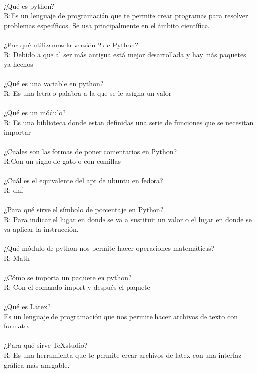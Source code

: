 \documentclass{book}
\begin{document}
	\\
	¿Qué es python?\\
	R:Es un lenguaje de programación que te permite crear programas para resolver problemas específicos. Se usa principalmente en el ámbito científico. \\
	\\
	¿Por qué utilizamos la versión 2 de Python?\\
	R: Debido a que al ser más antigua está mejor desarrollada y hay más paquetes ya hechos\\
	\\
	¿Qué es una variable en python?\\
	R: Es una letra o palabra a la que se le asigna un valor\\
	\\
	¿Qué es un módulo?\\
	R: Es una biblioteca donde estan definidas una serie de funciones que se necesitan importar \\
	\\
	¿Cuales son las formas de poner comentarios en Python?\\
	R:Con un signo de gato o con comillas\\
	\\
	¿Cuál es el equivalente del apt de ubuntu en fedora?\\
	R: dnf\\
	\\
	¿Para qué sirve el símbolo de porcentaje en Python?\\
	R: Para indicar el lugar en donde se va a sustituir un valor o el lugar en donde se va  aplicar la instrucción.\\
	\\
	¿Qué módulo de python nos permite hacer operaciones matemáticas?\\
	R: Math\\
	\\
	¿Cómo se importa un paquete en python?\\
	R: Con el comando import y después el paquete\\
	\\
	¿Qué es Latex?\\
	Es un lenguaje de programación que nos permite hacer archivos de texto con formato.\\
	\\
	¿Para qué sirve TeXstudio?\\
	R: Es una herramienta que te permite crear archivos de latex con una interfaz gráfica más amigable.\\
	\\
\end{document}
